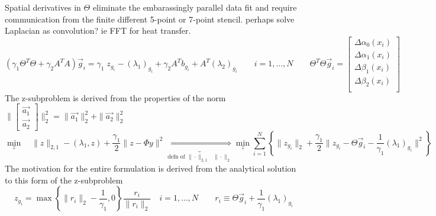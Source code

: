 \documentclass[10pt]{amsart}
\begin{document}
Spatial derivatives in $\Theta$ eliminate the embarassingly parallel data
fit and require communication from the finite different 5-point or 7-point stencil.
{\color{red} perhaps solve Laplacian as convolution? ie FFT for heat transfer.}
\[
   \left(\gamma_1 \Theta^T \Theta  + \gamma_2 A^T A  \right) \vec{g}_i
    = 
    \gamma_1 \;  z_{g_i}  -(\lambda_1)_{g_i} + \gamma_2 A^T b_{g_i} + A^T (\lambda_2)_{g_i}
  \qquad i = 1, ... , N
\qquad
   \Theta^T \Theta  \vec{g}_i =
\begin{bmatrix} 
 \Delta \alpha_0(x_i) \\
 \Delta \alpha_1(x_i) \\
 \Delta  \beta_1(x_i) \\
 \Delta  \beta_2(x_i) \\
\end{bmatrix} 
\]
The z-subproblem is derived from the properties of the norm
$ \|\begin{bmatrix} \vec{a_1} \\ \vec{a_2}\end{bmatrix}\|_2^2 =
\|\vec{a_1}\|_2^2 + \|\vec{a_2}\|_2^2$
\[
   \min_{z} \quad \|z\|_{2,1}  
        - \left(\lambda_1,z \right) + \frac{\gamma_1}{2} \|z -\Phi y\|^2
\underbrace{\quad \Leftrightarrow \quad}_\text{defn of $\|\cdot\|_{2,1}$  $\|\cdot\|_2$}
   \min_{z} \sum_{i=1}^N \left\{
    \|z_{g_i}\|_2 + \frac{\gamma_1}{2} \|z_{g_i} -\Theta \vec{g}_i -
\frac{1}{\gamma_1} (\lambda_1)_{g_i}\|^2
                         \right\}
\]
The motivation for the entire formulation is derived from the analytical 
solution to this form of the z-subproblem
\[
   z_{g_i} =  \max \left\{ \|r_i\|_2 - \frac{1}{\gamma_1} , 0\right\} \frac{r_i}{\|r_i\|_2 }
   \quad  i = 1,..., N
   \qquad
   r_i \equiv \Theta \vec{g}_i  + \frac{1}{\gamma_1} (\lambda_1)_{g_i}
\]
\end{document}
